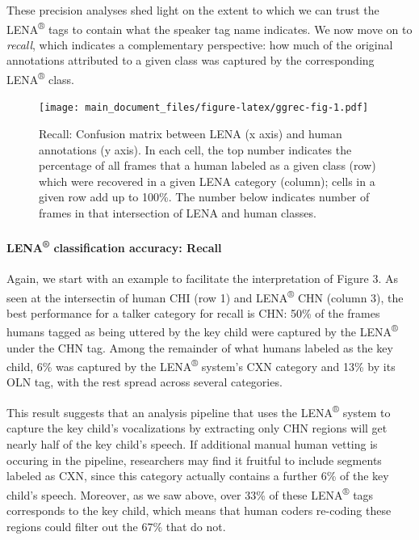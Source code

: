 \documentclass[english,table,man,floatsintext]{apa6}
\let\oldparagraph\paragraph
\renewcommand{\paragraph}[1]{\oldparagraph{#1}\mbox{}}
\begin{document}
These precision analyses shed light on the extent to which we can trust the LENA\textsuperscript{®} tags to contain what the speaker tag name indicates. We now move on to \emph{recall}, which indicates a complementary perspective: how much of the original annotations attributed to a given class was captured by the corresponding LENA\textsuperscript{®} class.

\begin{figure}
\centering
\texttt{[image: main\_document\_files/figure-latex/ggrec-fig-1.pdf]}
\caption{\label{fig:ggrec-fig}Recall: Confusion matrix between LENA (x axis) and human annotations (y axis). In each cell, the top number indicates the percentage of all frames that a human labeled as a given class (row) which were recovered in a given LENA category (column); cells in a given row add up to 100\%. The number below indicates number of frames in that intersection of LENA and human classes.}
\end{figure}

\hypertarget{lena-classification-accuracy-recall}{%
\paragraph{\texorpdfstring{LENA\textsuperscript{®} classification accuracy: Recall}{LENA® classification accuracy: Recall}}\label{lena-classification-accuracy-recall}}

Again, we start with an example to facilitate the interpretation of Figure 3. As seen at the intersectin of human CHI (row 1) and LENA\textsuperscript{®} CHN (column 3), the best performance for a talker category for recall is CHN: 50\% of the frames humans tagged as being uttered by the key child were captured by the LENA\textsuperscript{®} under the CHN tag. Among the remainder of what humans labeled as the key child, 6\% was captured by the LENA\textsuperscript{®} system's CXN category and 13\% by its OLN tag, with the rest spread across several categories.

This result suggests that an analysis pipeline that uses the LENA\textsuperscript{®} system to capture the key child's vocalizations by extracting only CHN regions will get nearly half of the key child's speech. If additional manual human vetting is occuring in the pipeline, researchers may find it fruitful to include segments labeled as CXN, since this category actually contains a further 6\% of the key child's speech. Moreover, as we saw above, over 33\% of these LENA\textsuperscript{®} tags corresponds to the key child, which means that human coders re-coding these regions could filter out the 67\% that do not.
\end{document}
